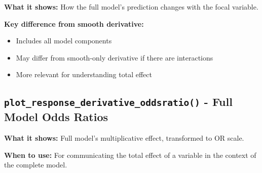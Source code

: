 \documentclass[12pt]{article}
\begin{document}
\textbf{What it shows:} How the full model's prediction changes with the focal variable.

\textbf{Key difference from smooth derivative:}
\begin{itemize}
   \item Includes all model components
   \item May differ from smooth-only derivative if there are interactions
   \item More relevant for understanding total effect
\end{itemize}

\subsection*{\texttt{plot\_response\_derivative\_oddsratio()} - Full Model Odds Ratios}

\textbf{What it shows:} Full model's multiplicative effect, transformed to OR scale.

\textbf{When to use:} For communicating the total effect of a variable in the context of the complete model.
\end{document}
